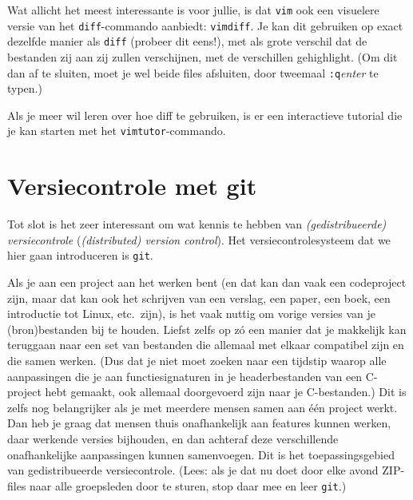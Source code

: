 \documentclass[a4paper,twoside,openany]{memoir}
\begin{document}
Wat allicht het meest interessante is voor jullie, is dat \verb!vim! ook een
visuelere versie van het \verb!diff!-commando aanbiedt: \verb!vimdiff!. Je kan
dit gebruiken op exact dezelfde manier als \verb!diff! (probeer dit eens!), met
als grote verschil dat de bestanden zij aan zij zullen verschijnen, met de
verschillen gehighlight. (Om dit dan af te sluiten, moet je wel beide files
afsluiten, door tweemaal \verb!:q!\emph{enter} te typen.)

Als je meer wil leren over hoe diff te gebruiken, is er een interactieve
tutorial die je kan starten met het \verb!vimtutor!-commando.

\chapter{Versiecontrole met git}

Tot slot is het zeer interessant om wat kennis te hebben van
\emph{(gedistribueerde) versiecontrole} (\emph{(distributed) version control}).
Het versiecontrolesysteem dat we hier gaan introduceren is \verb!git!.

Als je aan een project aan het werken bent (en dat kan dan vaak een codeproject
zijn, maar dat kan ook het schrijven van een verslag, een paper, een boek, 
een introductie tot Linux, etc.~zijn), is het vaak nuttig om vorige versies van
je (bron)bestanden bij te houden. Liefst zelfs op z\'o een manier dat je makkelijk kan teruggaan
naar een set van bestanden die allemaal met elkaar compatibel zijn en die samen
werken. (Dus dat je niet moet zoeken naar een tijdstip waarop alle aanpassingen
die je aan functiesignaturen in je headerbestanden van een C-project hebt
gemaakt, ook allemaal doorgevoerd zijn naar je C-bestanden.) Dit is zelfs nog
belangrijker als je met meerdere mensen samen aan één project werkt. Dan heb je
graag dat mensen thuis onafhankelijk aan features kunnen werken, daar werkende
versies bijhouden, en dan achteraf deze verschillende onafhankelijke
aanpassingen kunnen samenvoegen. Dit is het toepassingsgebied van
gedistribueerde versiecontrole. (Lees: als je dat nu doet door elke avond
ZIP-files naar alle groepsleden door te sturen, stop daar mee en leer
\verb!git!.)
\end{document}

